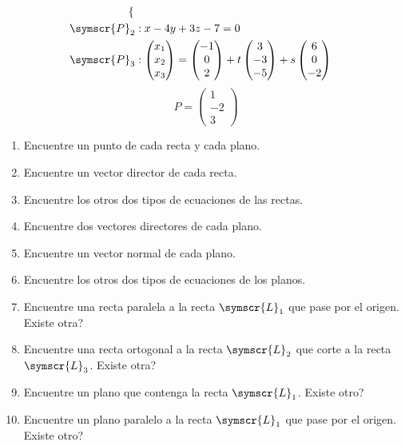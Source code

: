 \documentclass{article}
\def\fancyL{\symscr{L}}
\def\fancyP{\symscr{P}}
\begin{document}
\begin{enumerate}
\[\begin{aligned}
\begin{cases}
            \end{cases} \\
            \fancyP_2 &:
            x - 4y + 3z - 7 = 0 \\ 
            \fancyP_3 &:
            \begin{pmatrix}x_1 \\ x_2 \\ x_3\end{pmatrix}
            =
            \begin{pmatrix}-1 \\ 0 \\ 2\end{pmatrix}
            + t\begin{pmatrix}3 \\ -3 \\ -5\end{pmatrix}
            + s\begin{pmatrix}6 \\ 0 \\ -2\end{pmatrix}
        \end{aligned}
    \]
    \[
        P = \begin{pmatrix}
            1 \\ -2 \\ 3
        \end{pmatrix}
    \]
    \begin{enumerate}[label=\listAlph]
		\item Encuentre un punto de cada recta y cada plano.
		\item Encuentre un vector director de cada recta.
		\item Encuentre los otros dos tipos de ecuaciones de las rectas.
		\item Encuentre dos vectores directores de cada plano.
		\item Encuentre un vector normal de cada plano.
		\item Encuentre los otros dos tipos de ecuaciones de los planos.
        \item Encuentre una recta paralela a la recta \(\fancyL_1\) que pase por el origen. Existe otra?
        \item Encuentre una recta ortogonal a la recta \(\fancyL_2\) que corte a la recta \(\fancyL_3\). Existe otra?
        \item Encuentre un plano que contenga la recta \(\fancyL_1\). Existe otro?
        \item Encuentre un plano paralelo a la recta \(\fancyL_1\) que pase por el origen. Existe otro?

\end{enumerate}
\end{enumerate}
\end{document}
